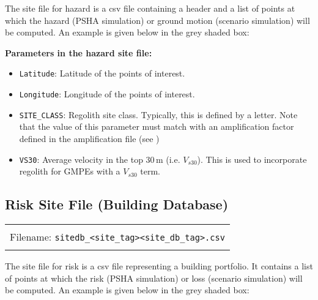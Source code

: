 The site file for hazard is a csv file containing a header and a list
of points at which the hazard (PSHA simulation) or ground motion
(scenario simulation) will be computed. An example is given below in
the grey shaded box:
 


\textbf{Parameters in the hazard site file:}
\begin{itemize}
\item \texttt{Latitude}: Latitude of the points of interest.
\item \texttt{Longitude}: Longitude of the points of interest.
\item \texttt{SITE\_CLASS}: Regolith site class. Typically, this is defined
by a letter. Note that the value of this parameter must match with
an amplification factor defined in the amplification file (see
)
\item \texttt{VS30}: Average velocity in the top 30\,m (i.e. $V_{s30}$). This is used
to incorporate regolith for GMPEs with a $V_{s30}$ term.
\end{itemize}

\subsection{Risk Site File (Building Database)}
\label{sec:grids-bdatabase}

\begin{center}
\begin{tabular}{|c|}
\hline
\\
Filename: \texttt{sitedb\_<site\_tag><site\_db\_tag>.csv} \\
\\
\hline
\end{tabular}
\end{center}

The site file for risk is a csv file representing a building
portfolio. It contains a list of points at which the risk (PSHA simulation)
 or loss (scenario simulation) will be computed. An example is
 given below in the grey shaded box:



